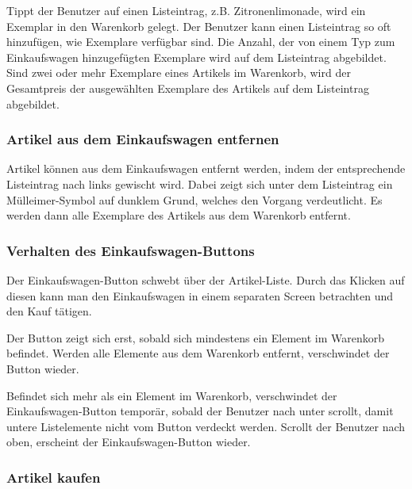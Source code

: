 Tippt der Benutzer auf einen Listeintrag, z.B. Zitronenlimonade, wird ein Exemplar in den Warenkorb gelegt.
Der Benutzer kann einen Listeintrag so oft hinzufügen, wie Exemplare verfügbar sind.
Die Anzahl, der von einem Typ zum Einkaufswagen hinzugefügten Exemplare wird auf dem Listeintrag abgebildet.
Sind zwei oder mehr Exemplare eines Artikels im Warenkorb, wird der Gesamtpreis der ausgewählten Exemplare des Artikels auf dem Listeintrag abgebildet.

\subsubsection{Artikel aus dem Einkaufswagen entfernen} \label{subsubsec:shoppingcart-del-item}

Artikel können aus dem Einkaufswagen entfernt werden, indem der entsprechende Listeintrag nach links gewischt wird.
Dabei zeigt sich unter dem Listeintrag ein Mülleimer-Symbol auf dunklem Grund, welches den Vorgang verdeutlicht.
Es werden dann alle Exemplare des Artikels aus dem Warenkorb entfernt.

\subsubsection{Verhalten des Einkaufswagen-Buttons} \label{subsubsec:shoppingcart-button}

Der Einkaufswagen-Button schwebt über der Artikel-Liste.
Durch das Klicken auf diesen kann man den Einkaufswagen in einem separaten Screen betrachten und den Kauf tätigen.

Der Button zeigt sich erst, sobald sich mindestens ein Element im Warenkorb befindet.
Werden alle Elemente aus dem Warenkorb entfernt, verschwindet der Button wieder.

Befindet sich mehr als ein Element im Warenkorb, verschwindet der Einkaufswagen-Button temporär, sobald der Benutzer nach unter scrollt, damit untere Listelemente nicht vom Button verdeckt werden.
Scrollt der Benutzer nach oben, erscheint der Einkaufswagen-Button wieder.

\subsubsection{Artikel kaufen} \label{subsubsec:shop-buy}

